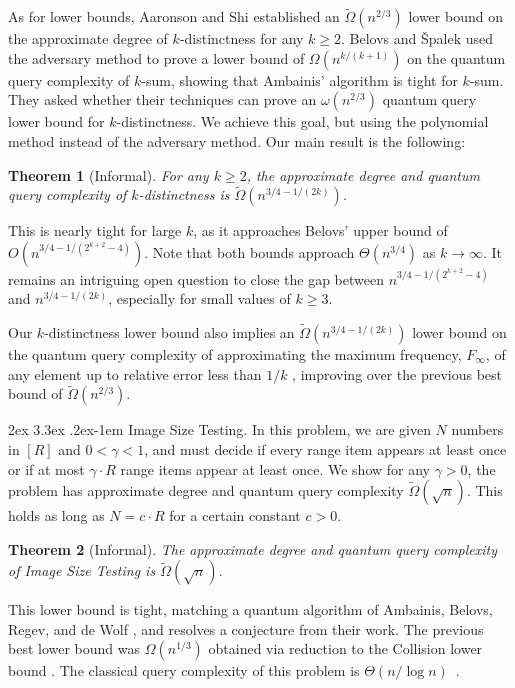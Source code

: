 \documentclass[11pt, letterpaper, fleqn]{article}
\makeatletter
\newcommand{\para}{
  \@startsection{paragraph}{4}
  {\z@}{2ex \@plus 3.3ex \@minus .2ex}{-1em}
  {\normalfont\normalsize\bfseries}
}
\newtheorem{theorem}{Theorem}
\theoremstyle{plain}
\makeatother
\begin{document}
As for lower bounds, Aaronson and Shi \cite{aaronsonshi} established an $\tilde{\Omega}(n^{2/3})$ lower bound on the approximate degree of $k$-distinctness for any $k\geq 2$. Belovs and \v{S}palek used the adversary method to prove a lower bound of $\Omega(n^{k/(k+1)})$ on the quantum query
complexity of $k$-sum, showing that Ambainis' algorithm is tight for $k$-sum. 
They asked whether their techniques can prove an $\omega(n^{2/3})$ quantum query lower bound for $k$-distinctness. 
We achieve this goal, but using the polynomial method instead of the adversary method.
Our main result is the following:

\begin{theorem}[Informal]  \label{thm:introkdist} For any $k\geq 2$, the approximate degree and quantum query complexity of $k$-distinctness 
is $\tilde{\Omega}(n^{3/4-1/(2k)})$. \end{theorem}


This is nearly tight for large $k$, as it approaches Belovs' upper bound of $O(n^{3/4-1/(2^{k + 2} - 4)})$. 
Note that both bounds approach $\Theta(n^{3/4})$ as $k\to \infty$.
It remains an intriguing open question to close the gap between $n^{3/4-1/(2^{k + 2} - 4)}$ and $n^{3/4-1/(2k)}$, especially for small values of $k \geq 3$. 

Our $k$-distinctness lower bound also implies an $\tilde{\Omega}(n^{3/4-1/(2k)})$ lower bound on the quantum query complexity of approximating the maximum frequency, $F_{\infty}$, of any element up to relative error less than $1/k$ \cite{montanaro}, improving over the previous best bound of $\tilde{\Omega}(n^{2/3})$. 


\para{Image Size Testing.} In this problem, we are given $N$ numbers in $[R]$ and $0<\gamma<1$, and must decide if every range item appears at least once or if at most $\gamma\cdot R$ range items appear at least once. 
We show for any $\gamma > 0$, the problem has approximate degree and quantum query complexity $\tilde{\Omega}(\sqrt{n})$. 
This holds as long as $N=c\cdot R$ for a certain constant $c>0$.

\begin{theorem}[Informal]  \label{thm:imagesize} The approximate degree and quantum query complexity of Image Size Testing
is $\tilde{\Omega}(\sqrt{n})$. 
\end{theorem}

This lower bound is tight, matching a quantum algorithm of Ambainis, Belovs, Regev, and de Wolf \cite{juntatesting}, and resolves a conjecture from their work. The previous best lower bound was $\Omega(n^{1/3})$ \cite{juntatesting} obtained via reduction to the Collision lower bound \cite{aaronsonshi}. The classical query complexity of this problem is $\Theta(n/\log n)$~\cite{VV11}.
\end{document}
